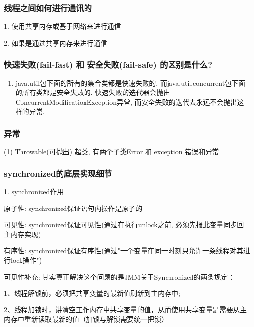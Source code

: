\documentclass[UTF8]{ctexart}
\begin{document}
\subsubsection{线程之间如何进行通讯的}
1. 使用共享内存或基于网络来进行通信 \par
2. 如果是通过共享内存来进行通信
\subsubsection{快速失败(fail-fast) 和 安全失败(fail-safe) 的区别是什么?}
\begin{enumerate}
	\item java.util包下面的所有的集合类都是快速失败的, 而java.util.concurrent包下面的所有类都是安全失败的. 快速失败的迭代器会抛出ConcurrentModificationException异常, 而安全失败的迭代去永远不会抛出这样的异常.

\end{enumerate}
\subsubsection{异常}
(1) Throwable(可抛出) 超类, 有两个子类Error 和 exception 错误和异常
\subsubsection{synchronized的底层实现细节}
1. synchronized作用 \par
原子性: synchronized保证语句内操作是原子的 \par
可见性: synchronized保证可见性(通过在执行unlock之前, 必须先报此变量同步回主内存实现) \par
有序性: synchronized保证有序性(通过"一个变量在同一时刻只允许一条线程对其进行lock操作") \par
可见性补充: 	其实真正解决这个问题的是JMM关于Synchronized的两条规定：
\par
1、线程解锁前，必须把共享变量的最新值刷新到主内存中; \par
2、线程加锁时，讲清空工作内存中共享变量的值，从而使用共享变量是需要从主内存中重新读取最新的值（加锁与解锁需要统一把锁） \par
\end{document}
